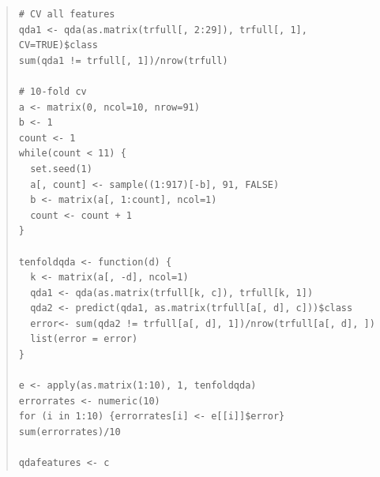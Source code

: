 \documentclass[11pt, a4paper]{article}
\begin{document}
\begin{quote}
\begin{verbatim}
# CV all features
qda1 <- qda(as.matrix(trfull[, 2:29]), trfull[, 1], CV=TRUE)$class
sum(qda1 != trfull[, 1])/nrow(trfull)

# 10-fold cv
a <- matrix(0, ncol=10, nrow=91)
b <- 1
count <- 1
while(count < 11) {
  set.seed(1)
  a[, count] <- sample((1:917)[-b], 91, FALSE)
  b <- matrix(a[, 1:count], ncol=1)
  count <- count + 1
}

tenfoldqda <- function(d) {
  k <- matrix(a[, -d], ncol=1)
  qda1 <- qda(as.matrix(trfull[k, c]), trfull[k, 1])
  qda2 <- predict(qda1, as.matrix(trfull[a[, d], c]))$class
  error<- sum(qda2 != trfull[a[, d], 1])/nrow(trfull[a[, d], ])
  list(error = error)
}

e <- apply(as.matrix(1:10), 1, tenfoldqda)
errorrates <- numeric(10)
for (i in 1:10) {errorrates[i] <- e[[i]]$error}
sum(errorrates)/10

qdafeatures <- c
\end{verbatim}
\end{quote}
\end{document}
